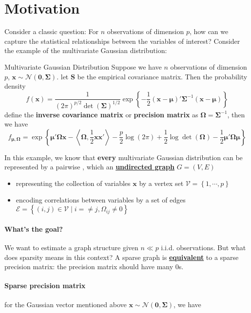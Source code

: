 \documentclass[twoside]{article}
\begin{document}

\section{Motivation}
Consider a classic question: For $n$ observations of dimension $p$, how can we capture the statistical relationships between the variables of interest? Consider the example of the multivariate Gaussian distribution:
\begin{example}{Multivariate Gaussian Distribution}{}
    Suppose we have $n$ observations of dimension $p$, $\mathbf{x}\sim \mathcal{N}(\mathbf{0},\boldsymbol{\Sigma})$. let $\mathbf{S}$ be the empirical covariance matrix. Then the probability density 
    $$
    f(\mathbf{x}) = \frac{1}{(2\pi)^{p/2}\det (\boldsymbol{\Sigma})^{1/2}}\exp\left\{ -\frac{1}{2}(\mathbf{x}-\boldsymbol{\mu})'\boldsymbol{\Sigma}^{-1}(\mathbf{x}-\boldsymbol{\mu}) \right\}
    $$
    define the \textbf{inverse covariance matrix} or \textbf{precision matrix} as $ \boldsymbol{\Omega}=\boldsymbol{\Sigma}^{-1} $, then we have 
    $$
    f_{\mathbf{\mu},\boldsymbol{\Omega}} = \exp \left\{ \boldsymbol{\mu'\Omega x} - \left< \boldsymbol{\Omega},\frac{1}{2}\mathbf{xx}' \right> -\frac{p}{2}\log(2\pi) + \frac{1}{2} \log\det(\boldsymbol{\Omega}) - \frac{1}{2}\boldsymbol{\mu'\Omega\mu} \right\}
    $$
\end{example}
In this example, we know that \textbf{every} multivariate Gaussian distribution can be represented by a pairwise , which an \textbf{\underline{undirected graph}} $G=(V,E)$
\begin{itemize}
    \item representing the collection of variables $\mathbf{x}$ by a vertex set $\mathcal{V}=\left\{1,\cdots,p\right\}$
    \item encoding correlations between variables by a set of edges $\mathcal{E}=\left\{ (i,j)\in \mathcal{V}\mid i=\neq j,\Omega_{ij}\neq 0 \right\}$  
\end{itemize}

\paragraph*{What's the goal?} We want to estimate a  graph structure given $n\ll p$ i.i.d. observations. But what does sparsity means in this context? A sparse graph is \textbf{\underline{equivalent}} to a sparse precision matrix: the precision matrix should have many 0s.

\paragraph*{Sparse precision matrix} for the Gaussian vector mentioned above $\mathbf{x}\sim\mathcal{N}(\mathbf{0},\boldsymbol{\Sigma})$, we have $$ $$

%
%
\end{document}
